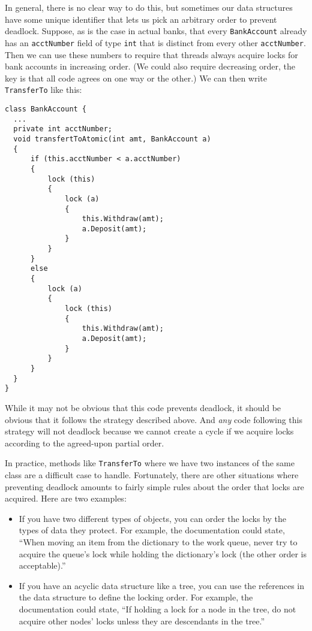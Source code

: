 \documentclass[10pt]{article}
\begin{document}
In general, there is no clear way to do this, but sometimes our data
structures have some unique identifier that lets us pick an arbitrary
order to prevent deadlock.  Suppose, as is the case in actual banks,
that every {\tt BankAccount} already has an {\tt acctNumber} field of type
{\tt int} that is distinct from every other {\tt acctNumber}.  Then we
can use these numbers to require that threads always acquire locks for
bank accounts in increasing order.  (We could also require decreasing
order, the key is that all code agrees on one way or the other.)  We
can then write {\tt TransferTo} like this:
\begin{verbatim}
class BankAccount {
  ...
  private int acctNumber;
  void transfertToAtomic(int amt, BankAccount a)
  {
      if (this.acctNumber < a.acctNumber)
      {
          lock (this)
          {
              lock (a)
              {
                  this.Withdraw(amt);
                  a.Deposit(amt);
              }
          }
      }
      else
      {
          lock (a)
          {
              lock (this)
              {
                  this.Withdraw(amt);
                  a.Deposit(amt);
              }
          }
      }
  }
}
\end{verbatim}
While it may not be obvious that this code prevents deadlock, it
should be obvious that it follows the strategy described above.  And
\emph{any} code following this strategy will not deadlock because we cannot
create a cycle if we acquire locks according to the agreed-upon
partial order.

In practice, methods like {\tt TransferTo} where we have two instances
of the same class are a difficult case to handle. Fortunately, 
there are other situations where preventing deadlock
amounts to fairly simple rules about the order that locks are
acquired.  Here are two examples:
\begin{itemize}
\item If you have two different types of objects, you can order the
  locks by the types of data they protect.  For example, the
  documentation could state, ``When moving an item from the dictionary
  to the work queue, never try to acquire the queue's lock while
  holding the dictionary's lock (the other order is acceptable).''
\item If you have an acyclic data structure like a tree, you can use
  the references in the data structure to define the locking order.
  For example, the documentation could state, ``If holding a lock for
  a node in the tree, do not acquire other nodes' locks unless they
  are descendants in the tree.''  
\end{itemize}
\end{document}
